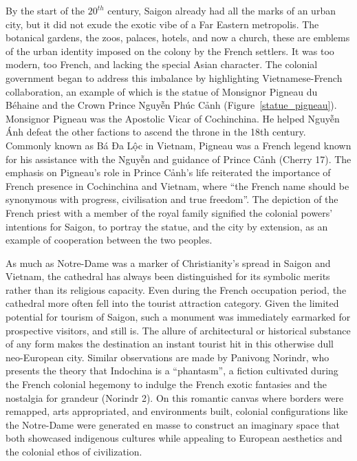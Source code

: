\vi By the start of the $20^{th}$ century, Saigon already had all the marks of an urban city, but it did not exude the exotic vibe of a Far Eastern metropolis. The botanical gardens, the zoos, palaces, hotels, and now a church, these are emblems of the urban identity imposed on the colony by the French settlers. It was too modern, too French, and lacking the special Asian character. The colonial government began to address this imbalance by highlighting Vietnamese-French collaboration, an example of which is the statue of Monsignor Pigneau du Béhaine and the Crown Prince Nguyễn Phúc Cảnh (Figure~\ref{statue_pigneau}). Monsignor Pigneau was the Apostolic Vicar of Cochinchina. He helped Nguyễn Ánh defeat the other factions to ascend the throne in the 18th century. Commonly known as Bá Đa Lộc in Vietnam, Pigneau was a French legend known for his assistance with the Nguyễn and guidance of Prince Cảnh (Cherry 17). The emphasis on Pigneau's role in Prince Cảnh's life reiterated the importance of French presence in Cochinchina and Vietnam, where “the French name should be synonymous with progress, civilisation and true freedom”. The depiction of the French priest with a member of the royal family signified the colonial powers' intentions for Saigon, to portray the statue, and the city by extension, as an example of cooperation between the two peoples.

As much as Notre-Dame was a marker of Christianity’s spread in Saigon and Vietnam, the cathedral has always been distinguished for its symbolic merits rather than its religious capacity. Even during the French occupation period, the cathedral more often fell into the tourist attraction category.  Given the limited potential for tourism of Saigon, such a monument was immediately earmarked for prospective visitors, and still is. The allure of architectural or historical substance of any form makes the destination an instant tourist hit in this otherwise dull neo-European city. Similar observations are made by Panivong Norindr, who presents the theory that Indochina is a “phantasm”, a fiction cultivated during the French colonial hegemony to indulge the French exotic fantasies and the nostalgia for grandeur (Norindr 2). On this romantic canvas where borders were remapped, arts appropriated, and environments built, colonial configurations like the Notre-Dame were generated en masse to construct an imaginary space that both showcased indigenous cultures while appealing to European aesthetics and the colonial ethos of civilization.

